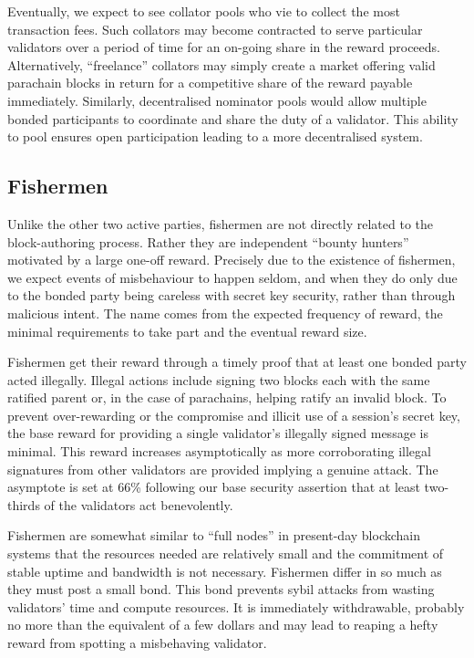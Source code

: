 \documentclass[9pt,oneside]{amsart}
\begin{document}
\begin{multicols}{2}
 Eventually, we expect to see collator pools who vie to collect the most transaction fees. Such collators may become contracted to serve particular validators over a period of time for an on-going share in the reward proceeds. Alternatively, ``freelance'' collators may simply create a market offering valid parachain blocks in return for a competitive share of the reward payable immediately. Similarly, decentralised nominator pools would allow multiple bonded participants to coordinate and share the duty of a validator. This ability to pool ensures open participation leading to a more decentralised system.

\subsection{Fishermen}
\label{fishermen}

 Unlike the other two active parties, fishermen are not directly related to the block-authoring process. Rather they are independent ``bounty hunters'' motivated by a large one-off reward. Precisely due to the existence of fishermen, we expect events of misbehaviour to happen seldom, and when they do only due to the bonded party being careless with secret key security, rather than through malicious intent. The name comes from the expected frequency of reward, the minimal requirements to take part and the eventual reward size.

 Fishermen get their reward through a timely proof that at least one bonded party acted illegally. Illegal actions include signing two blocks each with the same ratified parent or, in the case of parachains, helping ratify an invalid block. To prevent over-rewarding or the compromise and illicit use of a session's secret key, the base reward for providing a single validator's illegally signed message is minimal. This reward increases asymptotically as more corroborating illegal signatures from other validators are provided implying a genuine attack. The asymptote is set at 66\% following our base security assertion that at least two-thirds of the validators act benevolently.

 Fishermen are somewhat similar to ``full nodes'' in present-day blockchain systems that the resources needed are relatively small and the commitment of stable uptime and bandwidth is not necessary. Fishermen differ in so much as they must post a small bond. This bond prevents sybil attacks from wasting validators' time and compute resources. It is immediately withdrawable, probably no more than the equivalent of a few dollars and may lead to reaping a hefty reward from spotting a misbehaving validator.


\end{multicols}
\end{document}
